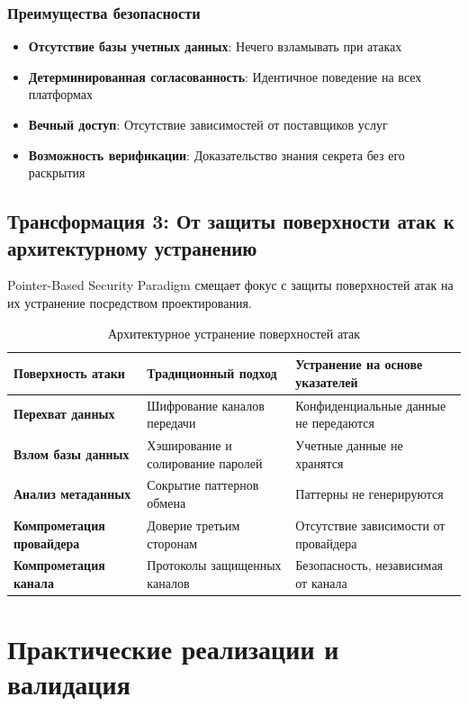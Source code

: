 \documentclass[11pt,a4paper]{article}
\begin{document}
\subsubsection{Преимущества безопасности}

\begin{itemize}
    \item \textbf{Отсутствие базы учетных данных}: Нечего взламывать при атаках
    \item \textbf{Детерминированная согласованность}: Идентичное поведение на всех платформах
    \item \textbf{Вечный доступ}: Отсутствие зависимостей от поставщиков услуг
    \item \textbf{Возможность верификации}: Доказательство знания секрета без его раскрытия
\end{itemize}

\subsection{Трансформация 3: От защиты поверхности атак к архитектурному устранению}

Pointer-Based Security Paradigm смещает фокус с защиты поверхностей атак на их устранение посредством проектирования.

\begin{table}[h]
\centering
\caption{Архитектурное устранение поверхностей атак}
\begin{tabularx}{\textwidth}{|l|X|X|}
\hline
\textbf{Поверхность атаки} & \textbf{Традиционный подход} & \textbf{Устранение на основе указателей} \\
\hline
\textbf{Перехват данных} & Шифрование каналов передачи & Конфиденциальные данные не передаются \\
\hline
\textbf{Взлом базы данных} & Хэширование и солирование паролей & Учетные данные не хранятся \\
\hline
\textbf{Анализ метаданных} & Сокрытие паттернов обмена & Паттерны не генерируются \\
\hline
\textbf{Компрометация провайдера} & Доверие третьим сторонам & Отсутствие зависимости от провайдера \\
\hline
\textbf{Компрометация канала} & Протоколы защищенных каналов & Безопасность, независимая от канала \\
\hline
\end{tabularx}
\end{table}

\section{Практические реализации и валидация}
\end{document}
